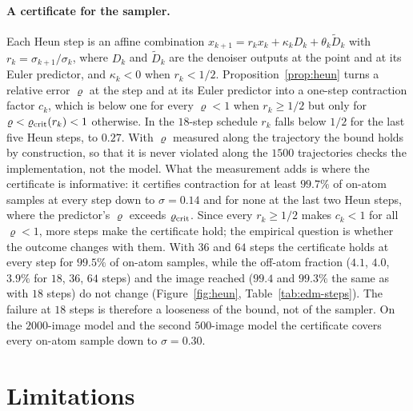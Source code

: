 \documentclass{article} %
\theoremstyle{plain}
\theoremstyle{definition}
\theoremstyle{remark}
\begin{document}
\paragraph{A certificate for the sampler.} Each Heun step is an affine combination
$x_{k+1}=r_kx_k+\kappa_kD_k+\theta_k\tilde D_k$ with $r_k=\sigma_{k+1}/\sigma_k$, where $D_k$ and
$\tilde D_k$ are the denoiser outputs at the point and at its Euler predictor, and
$\kappa_k<0$ when $r_k<1/2$. Proposition~\ref{prop:heun} turns a relative error $\varrho$ at the
step and at its Euler predictor into a one-step contraction factor $c_k$, which is below one for
every $\varrho<1$ when $r_k\ge1/2$ but only for $\varrho<\varrho_{\rm crit}(r_k)<1$ otherwise. In the
$18$-step schedule $r_k$ falls below $1/2$ for the last five Heun steps, to $0.27$. With $\varrho$
measured along the trajectory the bound holds by construction, so that it is never violated along
the $1500$ trajectories checks the implementation, not the model. What the measurement adds is
where the certificate is informative: it certifies contraction for at least $99.7\%$ of
on-atom samples at every step down to $\sigma=0.14$ and for none at the last two Heun steps, where
the predictor's $\varrho$ exceeds $\varrho_{\rm crit}$. Since every $r_k\ge1/2$ makes $c_k<1$ for
all $\varrho<1$, more steps make the certificate hold; the empirical question is whether the
outcome changes with them. With $36$ and
$64$ steps the certificate holds at every step for $99.5\%$ of on-atom samples, while the off-atom
fraction ($4.1$, $4.0$, $3.9\%$ for $18$, $36$, $64$ steps) and the image reached ($99.4$ and
$99.3\%$ the same as with $18$ steps) do not change (Figure~\ref{fig:heun}, Table~\ref{tab:edm-steps}).
The failure at $18$ steps is therefore a looseness of the bound, not of the sampler. On the
$2000$-image model and the second $500$-image model the certificate covers every on-atom sample
down to $\sigma=0.30$.

\FloatBarrier

\section{Limitations}
\label{sec:limitations}
\end{document}
